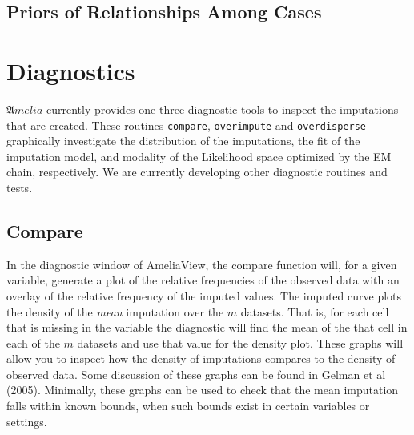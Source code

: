 \documentclass[12pt,titlepage]{article}
\newcommand{\Amelia}{\ensuremath{\mathfrak Amelia} }
\begin{document}
\subsection{Priors of Relationships Among Cases}
\label{sec:casepri}





\section{Diagnostics}
\label{sec:diag}
\Amelia currently provides one three diagnostic tools to inspect the imputations that are created.  These routines \texttt{compare}, \texttt{overimpute} and \texttt{overdisperse} graphically investigate the distribution of the imputations, the fit of the imputation model, and modality of the Likelihood space optimized by the EM chain, respectively.  We are currently developing other diagnostic routines and tests.  

\subsection{Compare}
In the diagnostic window of AmeliaView, the compare function will, for a given variable, generate a plot of the relative frequencies of the observed data with an overlay of the relative frequency of the imputed values.  The imputed curve plots the density of the \emph{mean} imputation over the $m$ datasets.  That is, for each cell that is missing in the variable the diagnostic will find the mean of the that cell in each of the $m$ datasets and use that value for the density plot.  These graphs will allow you to inspect how the density of imputations compares to the density of observed data. Some discussion of these graphs can be found in Gelman et al (2005).  Minimally, these graphs can be used to check that the mean imputation falls within known bounds, when such bounds exist in certain variables or settings.
\end{document}
